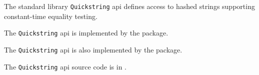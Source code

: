 
The standard library {\tt Quickstring} api defines access to hashed strings supporting 
constant-time equality testing.

The {\tt Quickstring} api is implemented by the  package.

The {\tt Quickstring} api is also implemented by the  package.

The {\tt Quickstring} api source code is in .

